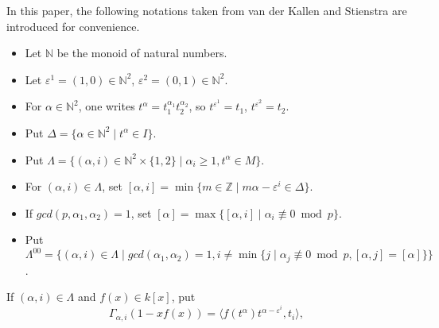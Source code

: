 In this paper, the following notations taken from van der Kallen and Stienstra \cite{MR86f:18017} are introduced for convenience.
\begin{itemize}
	\item Let $\mathbb{N}$ be the monoid of natural numbers. 
	\item Let $\varepsilon^1 = (1,0)\in \mathbb{N}^2$, $\varepsilon^2 = (0,1)\in \mathbb{N}^2$.
	\item For $\alpha \in \mathbb{N}^2$, one writes $t^{\alpha}=t_1^{\alpha_1}t_2^{\alpha_2}$, so $t^{\varepsilon^1}=t_1$, $t^{\varepsilon^2}=t_2$. 
	\item Put $\Delta=\{\alpha\in\mathbb{N}^2\mid  t^{\alpha}\in I\}$.%
	\item Put $\Lambda=\{(\alpha,i)\in\mathbb{N}^2 \times \{1,2\}\mid  \alpha_i\geq 1, t^{\alpha}\in M\}$. 
	\item For $(\alpha,i)\in\Lambda$, set $[\alpha,i]=\min\{m\in \mathbb{Z}\mid m\alpha - \varepsilon^i\in \Delta\}$. %
	\item If $gcd(p,\alpha_1,\alpha_2)=1$, set $[\alpha]=\max\{[\alpha,i]\mid  \alpha_i  \not\equiv 0 \bmod p\}$.
	\item Put $\Lambda^{00}= \big\{(\alpha,i)\in \Lambda\mid  gcd(\alpha_1,\alpha_2)=1, i\neq \min\{j\mid \alpha_j\not\equiv 0 \bmod p, [\alpha,j]=[\alpha]\} \big\}$.
\end{itemize}
If $(\alpha,i)\in \Lambda$ and $f(x)\in k[x]$, put
\[\Gamma_{\alpha,i}(1-xf(x))= \langle f(t^\alpha)t^{\alpha-\varepsilon^i},t_i \rangle,\]
